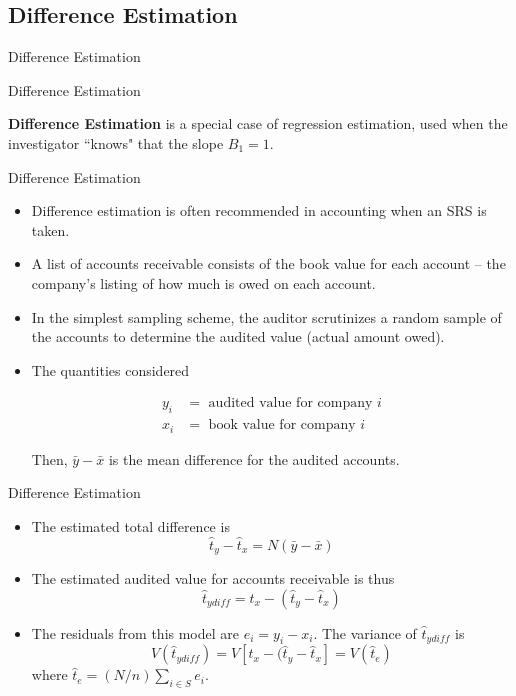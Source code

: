 \documentclass[10pt]{beamer}\usepackage[]{graphicx}\usepackage[]{xcolor}
\begin{document}
\subsection{Difference Estimation}

\begin{frame}{}
\begin{block}{}
\begin{center}
Difference Estimation
\end{center}
\end{block}

\end{frame}

\begin{frame}{Difference Estimation}
\begin{block}{}
\textbf{Difference Estimation} is a special case of regression estimation, used when the investigator ``knows" that the slope $B_1=1$.
\end{block}
\end{frame}

\begin{frame}{Difference Estimation}
\begin{block}{}
\begin{itemize}
\item Difference estimation is often recommended in accounting when an SRS is taken.
\item A list of accounts receivable consists of the book value for each account -- the company's listing of how much is owed on each account.
\item In the simplest sampling scheme, the auditor scrutinizes a random sample of the accounts to determine the audited value (actual amount owed).
\item The quantities considered

\begin{align*}
y_i &= \textrm{ audited value for company $i$}\\
x_i &= \textrm{ book value for company $i$}
\end{align*}

Then, $\bar{y}-\bar{x}$ is the mean difference for the audited accounts.
\end{itemize}
\end{block}
\end{frame}

\begin{frame}{Difference Estimation}
\begin{block}{}
\begin{itemize}
\item The estimated total difference is $$\hat{t}_y-\hat{t}_x=N(\bar{y}-\bar{x})$$
\item The estimated audited value for accounts receivable is thus
$$\hat{t}_{ydiff} = t_x-(\hat{t}_y-\hat{t}_x)$$
\item The residuals from this model are $e_i = y_i-x_i$. The variance of $\hat{t}_{ydiff}$ is
$$V(\hat{t}_{ydiff})= V[ t_x-(\hat{t}_y-\hat{t}_x] = V(\hat{t}_e)$$
where $\hat{t}_e = (N/n)\sum_{i \in S} e_i$.
\end{itemize}
\end{block}
\end{frame}
\end{document}
